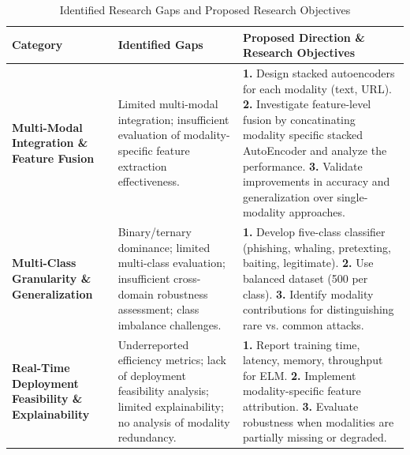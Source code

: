 \begin{table}[h!]
\centering
\caption{{Identified Research Gaps and Proposed Research Objectives}}
\label{tab:research_gaps_objectives}
\renewcommand{\arraystretch}{1.4}
\setlength{\tabcolsep}{4pt}


\begin{tabular}{|p{3.5cm}|p{5.5cm}|p{7cm}|}
\hline
\textbf{Category} & \textbf{Identified Gaps} & \textbf{Proposed Direction \& Research Objectives} \\ \hline

\textbf{Multi-Modal Integration \& Feature Fusion} &
Limited multi-modal integration; insufficient evaluation of modality-specific feature extraction effectiveness. &
\textbf{1.} Design stacked autoencoders for each modality (text, URL).  
\newline \textbf{2.} Investigate feature-level fusion by concatinating modality specific stacked AutoEncoder and analyze the performance.  
\newline \textbf{3.} Validate improvements in accuracy and generalization over single-modality approaches. \\ \hline

\textbf{Multi-Class Granularity \& Generalization} &
Binary/ternary dominance; limited multi-class evaluation; insufficient cross-domain robustness assessment; class imbalance challenges. &
\textbf{1.} Develop five-class classifier (phishing, whaling, pretexting, baiting, legitimate).  
\newline \textbf{2.} Use balanced dataset (500 per class).  
\newline \textbf{3.} Identify modality contributions for distinguishing rare vs. common attacks. \\ \hline

\textbf{Real-Time Deployment Feasibility \& Explainability} &
Underreported efficiency metrics; lack of deployment feasibility analysis; limited explainability; no analysis of modality redundancy. &
\textbf{1.} Report training time, latency, memory, throughput for ELM.  
\newline \textbf{2.} Implement modality-specific feature attribution.  
\newline \textbf{3.} Evaluate robustness when modalities are partially missing or degraded. \\ \hline


\end{tabular}

\end{table}

